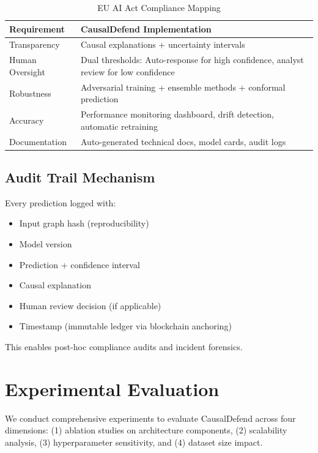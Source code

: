 \documentclass[conference]{IEEEtran}
\begin{document}
\begin{table}[!t]
\centering
\caption{EU AI Act Compliance Mapping}
\begin{tabular}{|p{4cm}|p{10cm}|}
\hline
\textbf{Requirement} & \textbf{CausalDefend Implementation} \\
\hline
Transparency & Causal explanations + uncertainty intervals \\
\hline
Human Oversight & Dual thresholds: Auto-response for high confidence, analyst review for low confidence \\
\hline
Robustness & Adversarial training + ensemble methods + conformal prediction \\
\hline
Accuracy & Performance monitoring dashboard, drift detection, automatic retraining \\
\hline
Documentation & Auto-generated technical docs, model cards, audit logs \\
\hline
\end{tabular}
\end{table}

\subsection{Audit Trail Mechanism}

Every prediction logged with:
\begin{itemize}
    \item Input graph hash (reproducibility)
    \item Model version
    \item Prediction + confidence interval
    \item Causal explanation
    \item Human review decision (if applicable)
    \item Timestamp (immutable ledger via blockchain anchoring)
\end{itemize}

This enables post-hoc compliance audits and incident forensics.

\section{Experimental Evaluation}\label{sec:evaluation}

We conduct comprehensive experiments to evaluate CausalDefend across four dimensions: (1) ablation studies on architecture components, (2) scalability analysis, (3) hyperparameter sensitivity, and (4) dataset size impact.
\end{document}
